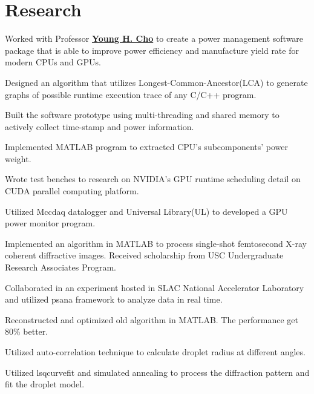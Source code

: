 \documentclass[]{deedy-resume-openfont}
\begin{document}
\begin{minipage}[t]{0.68\textwidth}
\section{Research}
Worked with Professor \textbf{\href{http://oasys.isi.edu/profile.php?id=1}{Young H. Cho}} to create a power management software package that is able to improve power efficiency and manufacture yield rate for modern CPUs and GPUs.
\begin{tightemize}
	\item Designed an algorithm that utilizes Longest-Common-Ancestor(LCA) to generate graphs of possible runtime execution trace of any C/C++ program.
	\item Built the software prototype using multi-threading and shared memory to actively collect time-stamp and power information.
	\item Implemented MATLAB program to extracted CPU's subcomponents' power weight.
	\item Wrote test benches to research on NVIDIA's GPU runtime scheduling detail on CUDA parallel computing platform.
	\item Utilized Mccdaq datalogger and Universal Library(UL) to developed a GPU power monitor program.
\end{tightemize}
\sectionsep

Implemented an algorithm in MATLAB to process single-shot femtosecond X-ray coherent diffractive images. Received scholarship from USC Undergraduate Research Associates Program.
\begin{tightemize}
	\item Collaborated in an experiment hosted in SLAC National Accelerator Laboratory and utilized psana framework to analyze data in real time.
	\item Reconstructed and optimized old algorithm in MATLAB. The performance get 80\% better.
	\item Utilized auto-correlation technique to calculate droplet radius at different angles.
	\item Utilized lsqcurvefit and simulated annealing to process the diffraction pattern and fit the droplet model.
\end{tightemize}
\sectionsep





\end{minipage} 
\end{document}
